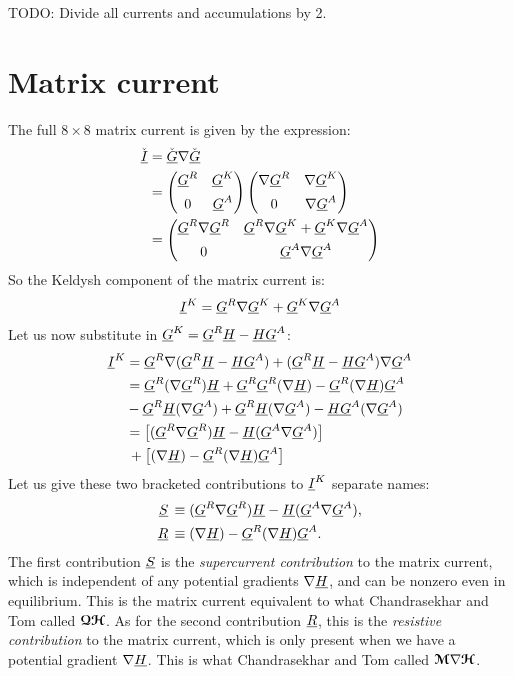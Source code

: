 TODO: Divide all currents and accumulations by 2.


\clearpage
\section{Matrix current}
The full $8\times8$ matrix current is given by the expression:
\begin{align}
  \check{\underline{I}} 
  &= 
  \check{\underline{G}} \nabla \check{\underline{G}}
  \\ &= 
  \begin{pmatrix} 
    \underline{G}^R  & \underline{G}^K \\[1ex] 0 & \underline{G}^A
  \end{pmatrix}
  \begin{pmatrix} 
    \nabla\underline{G}^R  & \nabla\underline{G}^K \\[1ex] 0 & \nabla\underline{G}^A
  \end{pmatrix}
  \\ &= 
  \begin{pmatrix} 
    \underline{G}^R\nabla\underline{G}^R  & \underline{G}^R\nabla\underline{G}^K + \underline{G}^K\nabla\underline{G}^A \\[1ex] 0 & \underline{G}^A\nabla\underline{G}^A
  \end{pmatrix}
\end{align}
So the Keldysh component of the matrix current is:
\begin{align}
  \underline{I}^K = \underline{G}^R\nabla\underline{G}^K + \underline{G}^K\nabla\underline{G}^A
\end{align}
Let us now substitute in $\underline{G}^K = \underline{G}^R \underline{H} - \underline{H} \underline{G}^A$:
\begin{align*}
  \underline{I}^K 
  &= 
  \underline{G}^R\nabla(\underline{G}^R \underline{H} - \underline{H} \underline{G}^A)+ (\underline{G}^R \underline{H} - \underline{H} \underline{G}^A) \nabla\underline{G}^A 
  \\ &=
  \underline{G}^R(\nabla\underline{G}^R) \underline{H} + \underline{G}^R\underline{G}^R (\nabla\underline{H}) - \underline{G}^R (\nabla\underline{H}) \underline{G}^A 
  \\ &
  - \underline{G}^R \underline{H} (\nabla\underline{G}^A) + \underline{G}^R \underline{H}(\nabla\underline{G}^A) - \underline{H} \underline{G}^A (\nabla\underline{G}^A)
  \\ &=
  \big[ (\underline{G}^R \nabla \underline{G}^R) \underline{H} - \underline{H} (\underline{G}^A \nabla \underline{G}^A) \big]
  \\ &\,+
  \big[ (\nabla\underline{H}) - \underline{G}^R (\nabla\underline{H}) \underline{G}^A \big]
\end{align*}
Let us give these two bracketed contributions to $\underline{I}^K$ separate names:
\begin{align}
  \underline{S}\, &\equiv (\underline{G}^R \nabla \underline{G}^R) \underline{H} - \underline{H} (\underline{G}^A \nabla \underline{G}^A),  \\
  \underline{R}\, &\equiv (\nabla\underline{H}) - \underline{G}^R (\nabla\underline{H}) \underline{G}^A.
\end{align}
The first contribution $\underline{S}$ is the \emph{supercurrent contribution} to the matrix current, which is independent of any potential gradients $\nabla\underline{H}$, and can be nonzero even in equilibrium.
This is the matrix current equivalent to what Chandrasekhar and Tom called $\bm{\mathcal{Q}}\bm{\mathcal{H}}$.
As for the second contribution $\underline{R}$, this is the \emph{resistive contribution} to the matrix current, which is only present when we have a potential gradient $\nabla\underline{H}$.
This is what Chandrasekhar and Tom called $\bm{\mathcal{M}}\nabla\bm{\mathcal{H}}$.


